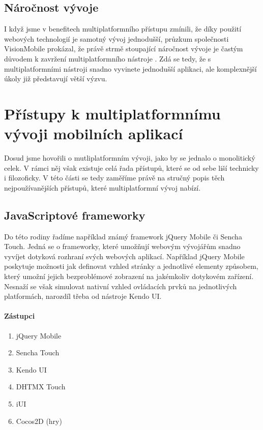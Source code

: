 \subsection{Náročnost vývoje}
I když jsme v benefitech multiplatformního přístupu zmínili, že díky použití webových technologií je samotný vývoj jednodušší, průzkum společnosti VisionMobile prokázal, že právě strmě stoupající náročnost vývoje je častým důvodem k zavržení multiplatformního nástroje \cite{visionmobile_survey}. Zdá se tedy, že s multiplatformními nástroji snadno vyvinete jednodušší aplikaci, ale komplexnější úkoly již představují větší výzvu.

\section{Přístupy k multiplatformnímu vývoji mobilních aplikací}
Dosud jsme hovořili o mutliplatformním vývoji, jako by se jednalo o monolitický celek. V rámci něj však existuje celá řada přístupů, které se od sebe liší technicky i filozoficky. V této části se tedy zaměříme právě na stručný popis těch nejpoužívanějších přístupů, které multiplatformní vývoj nabízí.

\subsection{JavaScriptové frameworky}
Do této rodiny řadíme například známý framework jQuery Mobile či Sencha Touch. Jedná se o frameworky, které umožňují webovým vývojářům snadno vyvíjet dotyková rozhraní svých webových aplikací. Například jQuery Mobile poskytuje možnosti jak definovat vzhled stránky a jednotlivé elementy způsobem, který umožní jejich bezproblémové zobrazení na jakémkoliv dotykovém zařízení. Nesnaží se však simulovat nativní vzhled ovládacích prvků na jednotlivých platformách, narozdíl třeba od nástroje Kendo UI.

\paragraph{Zástupci}
\begin{enumerate}
	\item jQuery Mobile
	\item Sencha Touch
	\item Kendo UI
	\item DHTMX Touch
	\item iUI
	\item Cocos2D (hry)
\end{enumerate}

